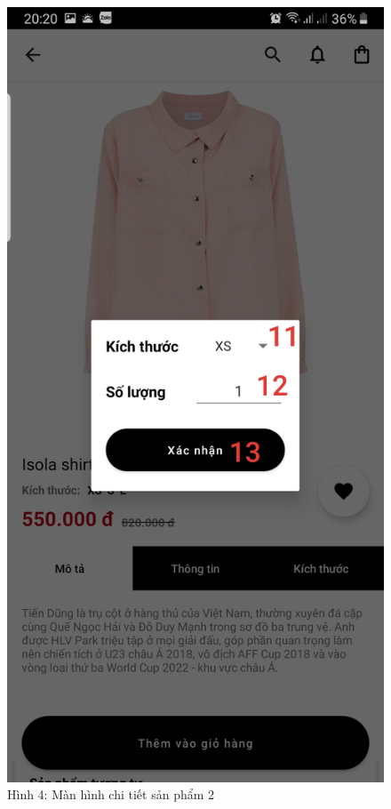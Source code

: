 \documentclass{beamer}
\begin{document}
\begin{frame}
    \begin{columns}
        \begin{figure}
            \centering
            \includegraphics[height=0.7\textheight]{images/04.png}
            \caption{\centering\tiny{Hình 4: Màn hình chi tiết sản phẩm 2}}


\end{figure}
\end{columns}
\end{frame}
\end{document}

